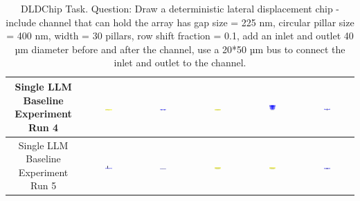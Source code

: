 \begin{table}[H]
\begin{tabular}{|c|c|c|c|c|c|}
    \hline
    Single LLM Baseline Experiment Run 4 & \includegraphics[width=0.15\textwidth]{./run_4/png/gpt-4o_results/DLDChip.png} & \includegraphics[width=0.15\textwidth]{./run_4/png/claude-3-5-sonnet-20240620_results/DLDChip.png} & \includegraphics[width=0.15\textwidth]{./run_4/png/watsonx_meta-llama_llama-3-1-70b-instruct_results/DLDChip.png} & \includegraphics[width=0.15\textwidth]{./run_4/png/watsonx_meta-llama_llama-3-405b-instruct_results/DLDChip.png} & \includegraphics[width=0.15\textwidth]{./run_4/png/o1-preview_results/DLDChip.png} \\
    \hline
    Single LLM Baseline Experiment Run 5 & \includegraphics[width=0.15\textwidth]{./run_5/png/gpt-4o_results/DLDChip.png} & \includegraphics[width=0.15\textwidth]{./run_5/png/claude-3-5-sonnet-20240620_results/DLDChip.png} & \includegraphics[width=0.15\textwidth]{./run_5/png/watsonx_meta-llama_llama-3-1-70b-instruct_results/DLDChip.png} & \includegraphics[width=0.15\textwidth]{./run_5/png/watsonx_meta-llama_llama-3-405b-instruct_results/DLDChip.png} & \includegraphics[width=0.15\textwidth]{./run_5/png/o1-preview_results/DLDChip.png} \\
    \hline
    \end{tabular}
    \caption{DLDChip Task. Question: Draw a deterministic lateral displacement chip - include channel that can hold the array has gap size = 225 nm, circular pillar size = 400 nm, width = 30 pillars, row shift fraction = 0.1, add an inlet and outlet 40 µm diameter before and after the channel, use a 20*50 µm bus to connect the inlet and outlet to the channel.}
\end{table}

